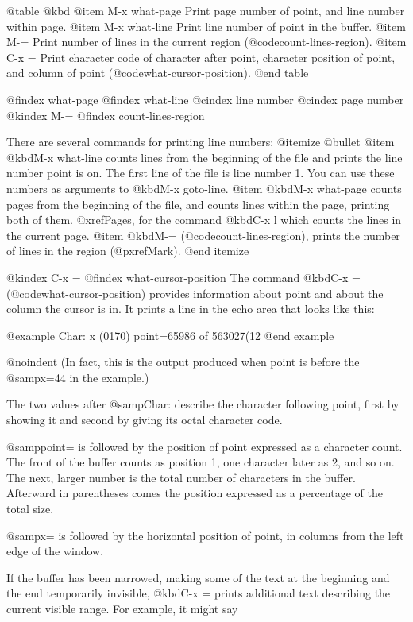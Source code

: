 {{@table @kbd
@item M-x what-page
Print page number of point, and line number within page.
@item M-x what-line
Print line number of point in the buffer.
@item M-=
Print number of lines in the current region (@code{count-lines-region}).
@item C-x =
Print character code of character after point, character position of
point, and column of point (@code{what-cursor-position}).
@end table

@findex what-page
@findex what-line
@cindex line number
@cindex page number
@kindex M-=
@findex count-lines-region

  There are several commands for printing line numbers:
@itemize @bullet
@item
@kbd{M-x what-line} counts lines from the beginning of the file and
prints the line number point is on.  The first line of the file is line
number 1.  You can use these numbers as arguments to @kbd{M-x
goto-line}.
@item
@kbd{M-x what-page} counts pages from the beginning of the file, and
counts lines within the page, printing both of them.  @xref{Pages}, for
the command @kbd{C-x l} which counts the lines in the current page.
@item
@kbd{M-=} (@code{count-lines-region}), prints the number of lines in
the region (@pxref{Mark}).
@end itemize

@kindex C-x =
@findex what-cursor-position
  The command @kbd{C-x =} (@code{what-cursor-position}) provides
information about point and about the column the cursor is in.
It prints a line in the echo area that looks like this:

@example
Char: x (0170)  point=65986 of 563027(12%
@end example

@noindent
(In fact, this is the output produced when point is before the @samp{x=44}
in the example.)

  The two values after @samp{Char:} describe the character following point,
first by showing it and second by giving its octal character code.

  @samp{point=} is followed by the position of point expressed as a character
count.  The front of the buffer counts as position 1, one character later
as 2, and so on.  The next, larger number is the total number of characters
in the buffer.  Afterward in parentheses comes the position expressed as a
percentage of the total size.

  @samp{x=} is followed by the horizontal position of point, in columns
from the left edge of the window.

  If the buffer has been narrowed, making some of the text at the
beginning and the end temporarily invisible, @kbd{C-x =} prints
additional text describing the current visible range.  For example, it
might say

}}
